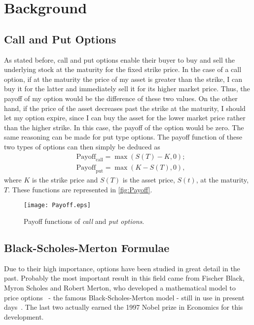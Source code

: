 \chapter{Background}
\label{chapter:background}
\section{Call and Put Options}
As stated before, call and put options enable their buyer to buy and sell the underlying stock at the maturity for the fixed strike price.
In the case of a call option, if at the maturity the price of my asset is greater than the strike, I can buy it for the latter and immediately sell it for its higher market price. Thus, the payoff of my option would be the difference of these two values. On the other hand, if the price of the asset decreases past the strike at the maturity, I should let my option expire, since I can buy the asset for the lower market price rather than the higher strike. In this case, the payoff of the option would be zero.
The same reasoning can be made for put type options.
The payoff function of these two types of options can then simply be deduced as
\begin{equation}\label{callput}
\begin{split}
&\text{Payoff}_\text{call}=\max\left(S(T)-K,0\right);\\
&\text{Payoff}_\text{put}=\max\left(K-S(T),0\right),
\end{split}
\end{equation}
\noindent where $K$ is the strike price and $S(T)$ is the asset price, $S(t)$, at the maturity, $T$. These functions are represented in \autoref{fig:Payoff}.

\begin{figure}[!htb]
    \centering
      \texttt{[image: Payoff.eps]}
      \caption{Payoff functions of \emph{call} and \emph{put options}.}\label{fig:Payoff}
    \end{figure}
    
\section{Black-Scholes-Merton Formulae}
\label{section:Black-Scholes-Merton Formulae}
Due to their high importance, options have been studied in great detail in the past.
Probably the most important result in this field came from Fischer Black, Myron Scholes and Robert Merton, who developed a mathematical model to price options~\cite{Scholes} - the famous Black-Scholes-Merton model - still in use in present days~\cite{Wilmott}. The last two actually earned the 1997 Nobel prize in Economics for this development.

